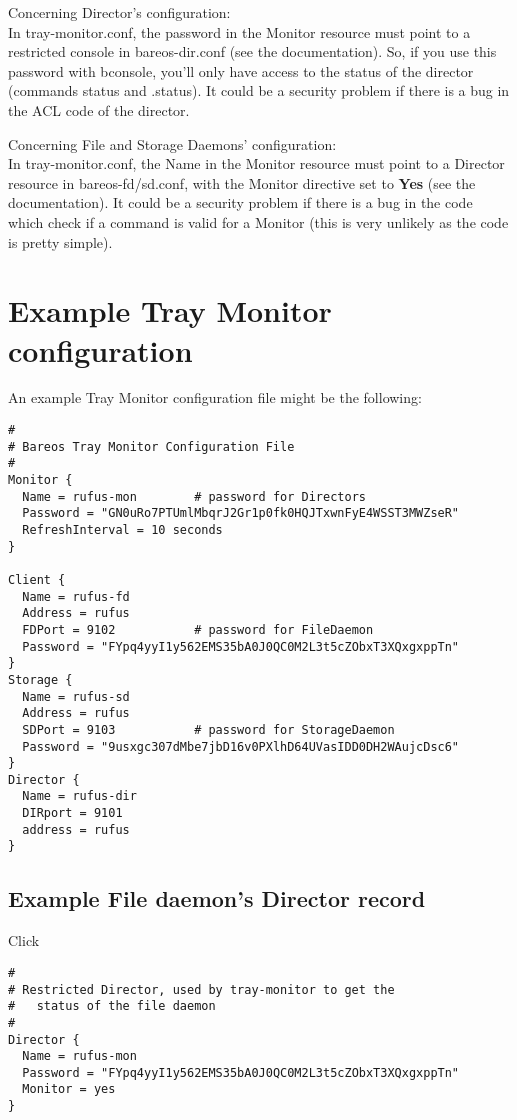 Concerning Director's configuration: \\
In tray-monitor.conf, the password in the Monitor resource must point to
a restricted console in bareos-dir.conf (see the documentation). So, if
you use this password with bconsole, you'll only have access to the
status of the director (commands status and .status).
It could be a security problem if there is a bug in the ACL code of the
director.

Concerning File and Storage Daemons' configuration:\\
In tray-monitor.conf, the Name in the Monitor resource must point to a
Director resource in bareos-fd/sd.conf, with the Monitor directive set
to {\bf Yes} (see the documentation).
It could be a security problem if there is a bug in the code which check
if a command is valid for a Monitor (this is very unlikely as the code
is pretty simple).


\section{Example Tray Monitor configuration}


An example Tray Monitor configuration file might be the following:

\footnotesize
\begin{verbatim}
#
# Bareos Tray Monitor Configuration File
#
Monitor {
  Name = rufus-mon        # password for Directors
  Password = "GN0uRo7PTUmlMbqrJ2Gr1p0fk0HQJTxwnFyE4WSST3MWZseR"
  RefreshInterval = 10 seconds
}

Client {
  Name = rufus-fd
  Address = rufus
  FDPort = 9102           # password for FileDaemon
  Password = "FYpq4yyI1y562EMS35bA0J0QC0M2L3t5cZObxT3XQxgxppTn"
}
Storage {
  Name = rufus-sd
  Address = rufus
  SDPort = 9103           # password for StorageDaemon
  Password = "9usxgc307dMbe7jbD16v0PXlhD64UVasIDD0DH2WAujcDsc6"
}
Director {
  Name = rufus-dir
  DIRport = 9101
  address = rufus
}
\end{verbatim}
\normalsize

\subsection{Example File daemon's Director record}

Click


\footnotesize
\begin{verbatim}
#
# Restricted Director, used by tray-monitor to get the
#   status of the file daemon
#
Director {
  Name = rufus-mon
  Password = "FYpq4yyI1y562EMS35bA0J0QC0M2L3t5cZObxT3XQxgxppTn"
  Monitor = yes
}
\end{verbatim}
\normalsize

